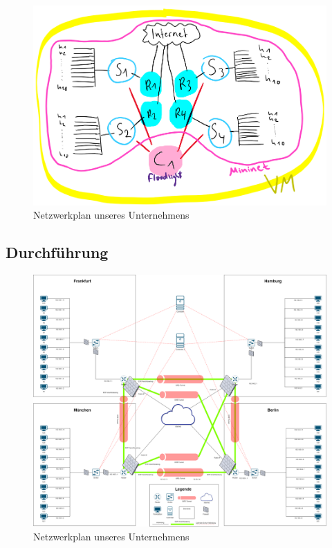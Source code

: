 \documentclass[fontsize=12pt,paper=a4,open=any,parskip=half,
  twoside=false,toc=listof,toc=bibliography,fleqn,leqno,
  captions=nooneline,captions=tableabove,british]{scrbook}
\begin{document}
\begin{figure}[htbp]
 \centering
 \includegraphics[width=1.0\textwidth]{Bilder/prototyp}
 \captionsetup{justification=centering,margin=2cm}
 \caption{Netzwerkplan unseres Unternehmens}
 \label{networkplan}
\end{figure}

\subsection{Durchführung}


\begin{figure}[htbp]
 \centering
 \includegraphics[width=1.0\textwidth]{Bilder/netzwerkplan}
 \captionsetup{justification=centering,margin=2cm}
 \caption{Netzwerkplan unseres Unternehmens}
 \label{networkplan}
\end{figure}
\end{document}
